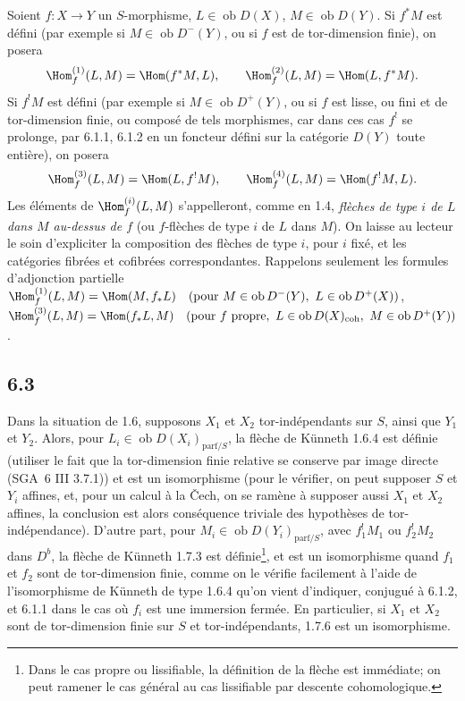 Soient $f:X\to Y$ un $S$-morphisme, $L\in\operatorname{ob}D(X)$, $M\in\operatorname{ob}D(Y)$. Si $f^*M$ est défini (par exemple si $M\in\operatorname{ob}D^-(Y)$, ou si $f$ est de tor-dimension finie), on posera
\[
\Hom_f^{(1)}(L,M)=\Hom(f^*M,L),\qquad
\Hom_f^{(2)}(L,M)=\Hom(L,f^*M).
\]
Si $f^!M$ est défini (par exemple si $M\in\operatorname{ob}D^+(Y)$, ou si $f$ est lisse, ou fini et de tor-dimension finie, ou composé de tels morphismes, car dans ces cas $f^!$ se
prolonge, par 6.1.1, 6.1.2 en un foncteur défini sur la catégorie $D(Y)$ toute entière), on posera
\[
\Hom_f^{(3)}(L,M)=\Hom(L,f^!M),\qquad
\Hom_f^{(4)}(L,M)=\Hom(f^!M,L).
\]
Les éléments de $\Hom_f^{(i)}(L,M)$ s'appelleront, comme en 1.4, \emph{flèches de type $i$ de $L$ dans $M$ au-dessus de $f$} (ou $f$-flèches de type $i$ de $L$ dans $M$). On laisse au lecteur le soin d'expliciter la composition des flèches de type $i$, pour $i$ fixé, et les catégories fibrées et cofibrées correspondantes. Rappelons seulement les formules d'adjonction partielle $\Hom_f^{(1)}(L,M)=\Hom(M,f_*L)\quad(\text{pour }M\in\operatorname{ob}D^{-}(Y),\ L\in\operatorname{ob}D^+(X))$, $\Hom_f^{(3)}(L,M)=\Hom(f_*L,M)\quad(\text{pour }f\text{ propre},\ L\in\operatorname{ob}D(X)_{\mathrm{coh}},\ M\in\operatorname{ob}D^+(Y))$.

\subsection*{6.3}
Dans la situation de 1.6, supposons $X_1$ et $X_2$ tor-indépendants sur $S$, ainsi que $Y_1$ et $Y_2$. Alors, pour $L_i\in\operatorname{ob}D(X_i)_{\mathrm{parf}/S}$, la flèche de Künneth 1.6.4 est définie (utiliser le fait que la tor-dimension finie relative se conserve par image directe (SGA~6 III 3.7.1)) et est un isomorphisme (pour le vérifier, on peut supposer $S$ et $Y_i$ affines, et, pour un calcul à la Čech, on se ramène à supposer aussi $X_1$ et $X_2$ affines, la conclusion est alors conséquence triviale des hypothèses de tor-indépendance). D'autre part, pour $M_i\in\operatorname{ob}D(Y_i)_{\mathrm{parf}/S}$, avec $f_1^!M_1$ ou $f_2^!M_2$ dans $D^b$, la flèche de Künneth 1.7.3 est définie\footnote{Dans le cas propre ou lissifiable, la définition de la flèche est immédiate; on peut ramener le cas général au cas lissifiable par descente cohomologique.}, et est un isomorphisme quand $f_1$ et $f_2$ sont de tor-dimension finie, comme on le vérifie facilement à l'aide de l'isomorphisme de Künneth de type 1.6.4 qu'on vient d'indiquer, conjugué à 6.1.2, et 6.1.1 dans le cas où $f_i$ est une immersion fermée. En particulier, si $X_1$ et $X_2$ sont de tor-dimension finie sur $S$ et tor-indépendants, 1.7.6 est un isomorphisme.

